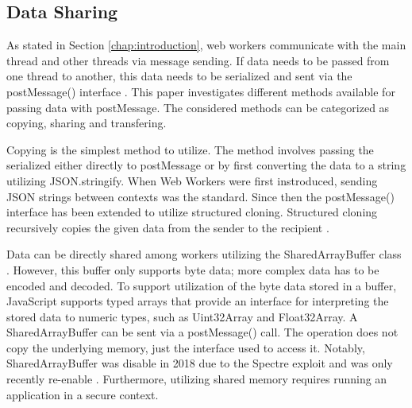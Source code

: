 \documentclass[conference, 9pt]{IEEEtran}
\begin{document}


\subsection{Data Sharing}

As stated in Section \ref{chap:introduction}, web workers communicate with the main thread and other threads via message sending. If data needs to be passed from one thread
to another, this data needs to be serialized and sent via the postMessage() interface \cite{mdnCloning}. This paper investigates different methods available for passing data with postMessage. The considered methods can be categorized as copying, sharing and transfering.

Copying is the simplest method to utilize. The method involves passing the serialized either directly to postMessage or by first converting the data to a string utilizing JSON.stringify. When Web Workers were first instroduced, sending JSON strings between contexts was the standard. Since then the postMessage() interface has been extended to utilize structured cloning. Structured cloning recursively copies the given data from the sender to the recipient \cite{mdnCloning}. 
    
Data can be directly shared among workers utilizing the SharedArrayBuffer class \cite{mdnShared}. However, this buffer only supports byte data;  more complex data has to be encoded and decoded. To support utilization of the byte data stored in a buffer, JavaScript supports typed arrays that provide an interface for interpreting the stored data to numeric types, such as Uint32Array and Float32Array. A SharedArrayBuffer can be sent via a postMessage() call. The operation does not copy the underlying memory, just the interface used to access it. Notably, SharedArrayBuffer was disable in 2018 due to the Spectre exploit and was only recently re-enable \cite{mdnShared}. Furthermore, utilizing shared memory requires running an application in a secure context.
\end{document}
